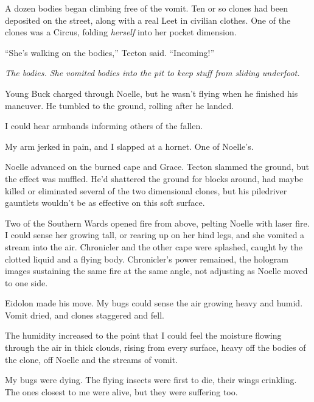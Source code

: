 A dozen bodies began climbing free of the vomit.  Ten or so clones had been deposited on the street, along with a real Leet in civilian clothes.  One of the clones was a Circus, folding \emph{herself} into her pocket dimension.



``She's walking on the bodies,'' Tecton said.  ``Incoming!''



\emph{The bodies.  She vomited bodies into the pit to keep stuff from sliding underfoot.}



Young Buck charged through Noelle, but he wasn't flying when he finished his maneuver.  He tumbled to the ground, rolling after he landed.



I could hear armbands informing others of the fallen.



My arm jerked in pain, and I slapped at a hornet.  One of Noelle's.



Noelle advanced on the burned cape and Grace.  Tecton slammed the ground, but the effect was muffled.  He'd shattered the ground for blocks around, had maybe killed or eliminated several of the two dimensional clones, but his piledriver gauntlets wouldn't be as effective on this soft surface.



Two of the Southern Wards opened fire from above, pelting Noelle with laser fire.  I could sense her growing tall, or rearing up on her hind legs, and she vomited a stream into the air.  Chronicler and the other cape were splashed, caught by the clotted liquid and a flying body.  Chronicler's power remained, the hologram images sustaining the same fire at the same angle, not adjusting as Noelle moved to one side.



Eidolon made his move.  My bugs could sense the air growing heavy and humid.  Vomit dried, and clones staggered and fell.



The humidity increased to the point that I could feel the moisture flowing through the air in thick clouds, rising from every surface, heavy off the bodies of the clone, off Noelle and the streams of vomit.



My bugs were dying.  The flying insects were first to die, their wings crinkling.  The ones closest to me were alive, but they were suffering too.



